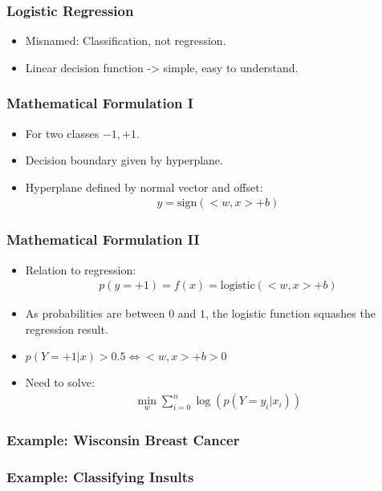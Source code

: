 \begin{frame}
    \frametitle{Logistic Regression}
    \begin{itemize}
        \item Misnamed: Classification, not regression.
        \item Linear decision function -> simple, easy to understand.
    \end{itemize}
\end{frame}

\begin{frame}
    \frametitle{Mathematical Formulation I}
    \begin{itemize}
        \item For two classes $-1, +1$.
        \item Decision boundary given by hyperplane.
        \item Hyperplane defined by normal vector and offset:
            \begin{align}
                y = \text{sign}(<w, x> + b)
            \end{align}
    \end{itemize}
\end{frame}

\begin{frame}
    \frametitle{Mathematical Formulation II}
    \begin{itemize}
        \item Relation to regression:
            \begin{align}
                p(y=+1) = f(x) = \text{logistic}(<w, x> + b)
            \end{align}
        \item As probabilities are between $0$ and $1$, the logistic function
            squashes the regression result.
        \item $p(Y=+1 | x) > 0.5 \Leftrightarrow <w, x> + b > 0$
        \item Need to solve:
            \begin{align}
                \min_w \sum_{i=0}^n \log(p(Y=y_i | x_i))
            \end{align}
    \end{itemize}
\end{frame}

\begin{frame}
    \frametitle{Example: Wisconsin Breast Cancer}
\end{frame}

\begin{frame}
    \frametitle{Example: Classifying Insults}
\end{frame}

